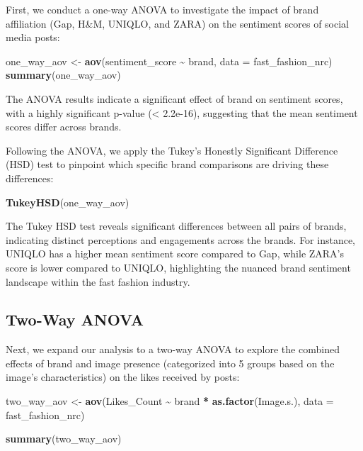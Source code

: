 \documentclass[
]{book}
\newenvironment{Shaded}{\begin{snugshade}}{\end{snugshade}}
\newcommand{\AttributeTok}[1]{\textcolor[rgb]{0.13,0.29,0.53}{#1}}
\newcommand{\FunctionTok}[1]{\textcolor[rgb]{0.13,0.29,0.53}{\textbf{#1}}}
\newcommand{\NormalTok}[1]{#1}
\newcommand{\OtherTok}[1]{\textcolor[rgb]{0.56,0.35,0.01}{#1}}
\newcommand{\SpecialCharTok}[1]{\textcolor[rgb]{0.81,0.36,0.00}{\textbf{#1}}}
\begin{document}
First, we conduct a one-way ANOVA to investigate the impact of brand affiliation (Gap, H\&M, UNIQLO, and ZARA) on the sentiment scores of social media posts:

\begin{Shaded}
\begin{Highlighting}[]
\NormalTok{one\_way\_aov }\OtherTok{\textless{}{-}} \FunctionTok{aov}\NormalTok{(sentiment\_score }\SpecialCharTok{\textasciitilde{}}\NormalTok{ brand, }\AttributeTok{data =}\NormalTok{ fast\_fashion\_nrc)}
\FunctionTok{summary}\NormalTok{(one\_way\_aov)}
\end{Highlighting}
\end{Shaded}

The ANOVA results indicate a significant effect of brand on sentiment scores, with a highly significant p-value (\textless{} 2.2e-16), suggesting that the mean sentiment scores differ across brands.

Following the ANOVA, we apply the Tukey's Honestly Significant Difference (HSD) test to pinpoint which specific brand comparisons are driving these differences:

\begin{Shaded}
\begin{Highlighting}[]
\FunctionTok{TukeyHSD}\NormalTok{(one\_way\_aov)}
\end{Highlighting}
\end{Shaded}

The Tukey HSD test reveals significant differences between all pairs of brands, indicating distinct perceptions and engagements across the brands. For instance, UNIQLO has a higher mean sentiment score compared to Gap, while ZARA's score is lower compared to UNIQLO, highlighting the nuanced brand sentiment landscape within the fast fashion industry.

\hypertarget{two-way-anova}{%
\subsection{Two-Way ANOVA}\label{two-way-anova}}

Next, we expand our analysis to a two-way ANOVA to explore the combined effects of brand and image presence (categorized into 5 groups based on the image's characteristics) on the likes received by posts:

\begin{Shaded}
\begin{Highlighting}[]
\NormalTok{two\_way\_aov }\OtherTok{\textless{}{-}} \FunctionTok{aov}\NormalTok{(Likes\_Count }\SpecialCharTok{\textasciitilde{}}\NormalTok{ brand }\SpecialCharTok{*} \FunctionTok{as.factor}\NormalTok{(Image.s.), }\AttributeTok{data =}\NormalTok{ fast\_fashion\_nrc)}

\FunctionTok{summary}\NormalTok{(two\_way\_aov)}
\end{Highlighting}
\end{Shaded}
\end{document}
